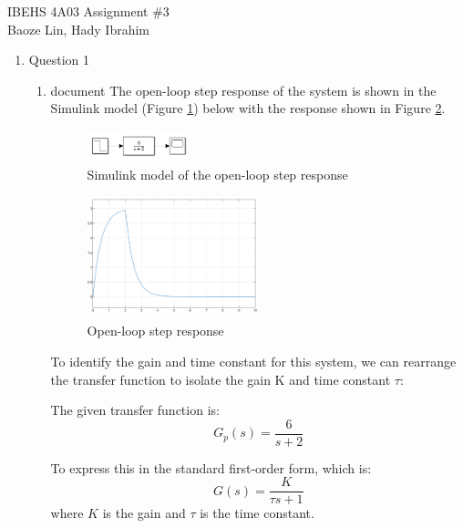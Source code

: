 \documentclass[12pt]{article}
\begin{document}
IBEHS 4A03 \hfill Assignment \#3\\
Baoze Lin, Hady Ibrahim

\hrulefill

\renewcommand{\theenumii}{\arabic{enumi}.\arabic{enumii}}

\begin{enumerate}
\item Question 1
  \begin{enumerate}
    \item document
    The open-loop step response of the system is shown in the Simulink model (Figure \ref{fig:figure1_1}) below with the response shown in Figure \ref{fig:figure1_2}.
    
    \begin{figure}[H]
      \centering
      \includegraphics[width=0.3\textwidth]{Figures/Models/model1_1.png}
      \caption{Simulink model of the open-loop step response}
      \label{fig:figure1_1}
    \end{figure}

    \begin{figure}[H]
      \centering
      \includegraphics[width=0.5\textwidth]{Figures/figure1_1.png}
      \caption{Open-loop step response}
      \label{fig:figure1_2}
    \end{figure}

    To identify the gain and time constant for this system, we can rearrange the transfer function to isolate the gain K and time constant $\tau$:

    The given transfer function is:
    \[
    G_p(s) = \frac{6}{s + 2}
    \]

    To express this in the standard first-order form, which is:
    \[
    G(s) = \frac{K}{\tau s + 1}
    \]
    where \( K \) is the gain and \( \tau \) is the time constant.


\end{enumerate}
\end{enumerate}
\end{document}
